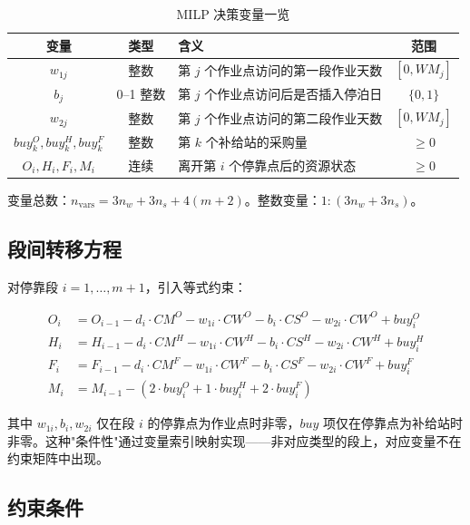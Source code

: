 \documentclass[12pt,a4paper]{ctexart}
\theoremstyle{definition}
\begin{document}
\begin{table}[H]
  \centering
  \caption{MILP 决策变量一览}
  \begin{tabular}{cclc}
    \toprule
    变量 & 类型 & 含义 & 范围 \\
    \midrule
    $w_{1j}$ & 整数 & 第 $j$ 个作业点访问的第一段作业天数 & $[0,WM_j]$ \\
    $b_j$    & 0--1 整数 & 第 $j$ 个作业点访问后是否插入停泊日 & $\{0,1\}$ \\
    $w_{2j}$ & 整数 & 第 $j$ 个作业点访问的第二段作业天数 & $[0,WM_j]$ \\
    $buy^O_k,buy^H_k,buy^F_k$ & 整数 & 第 $k$ 个补给站的采购量 & $\ge 0$ \\
    $O_i,H_i,F_i,M_i$ & 连续 & 离开第 $i$ 个停靠点后的资源状态 & $\ge 0$ \\
    \bottomrule
  \end{tabular}
\end{table}

变量总数：$n_{\text{vars}} = 3n_w + 3n_s + 4(m+2)$。整数变量：$1:(3n_w+3n_s)$。

\subsection{段间转移方程}

对停靠段 $i=1,\dots,m+1$，引入等式约束：

\begin{equation}\label{eq:milp-transfer}
  \begin{aligned}
    O_i &= O_{i-1} - d_i\cdot CM^O - w_{1i}\cdot CW^O - b_i\cdot CS^O - w_{2i}\cdot CW^O + buy^O_i \\
    H_i &= H_{i-1} - d_i\cdot CM^H - w_{1i}\cdot CW^H - b_i\cdot CS^H - w_{2i}\cdot CW^H + buy^H_i \\
    F_i &= F_{i-1} - d_i\cdot CM^F - w_{1i}\cdot CW^F - b_i\cdot CS^F - w_{2i}\cdot CW^F + buy^F_i \\
    M_i &= M_{i-1} - (2\cdot buy^O_i + 1\cdot buy^H_i + 2\cdot buy^F_i)
  \end{aligned}
\end{equation}

其中 $w_{1i},b_i,w_{2i}$ 仅在段 $i$ 的停靠点为作业点时非零，$buy$ 项仅在停靠点为补给站时非零。这种"条件性"通过变量索引映射实现——非对应类型的段上，对应变量不在约束矩阵中出现。

\subsection{约束条件}
\end{document}
